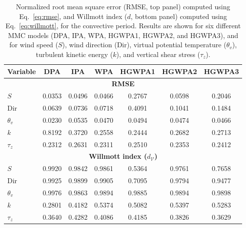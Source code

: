 \begin{table}[htb!]
\centering
\caption{Normalized root mean square error (RMSE, top panel) computed using Eq.~\ref{eq:rmse}, and Willmott index ($d$, bottom panel) computed using Eq.~\ref{eq:willmott}, for the convective period. Results are shown for six different MMC models (DPA, IPA, WPA, HGWPA1, HGWPA2, and HGWPA3), and for wind speed ($S$), wind direction (Dir), virtual potential temperature ($\theta_v$), turbulent kinetic energy ($k$), and vertical shear stress ($\tau_z$).}
\label{tab:convective}
\begin{tabular}{lcccccc}
\toprule
Variable & DPA & IPA & WPA & HGWPA1 & HGWPA2 & HGWPA3 \\
\midrule
\multicolumn{7}{c}{\textbf{RMSE}} \\
\midrule
$S$        & 0.0353 & 0.0496 & 0.0466 & 0.2767 & 0.0598 & 0.2046 \\
Dir        & 0.0639 & 0.0736 & 0.0718 & 0.4091 & 0.1041 & 0.1484 \\
$\theta_v$ & 0.0230 & 0.0535 & 0.0470 & 0.0494 & 0.0474 & 0.0466 \\
$k$        & 0.8192 & 0.3720 & 0.2558 & 0.2444 & 0.2682 & 0.2713 \\
$\tau_z$   & 0.2312 & 0.2631 & 0.2311 & 0.2510 & 0.2353 & 0.2412 \\
\midrule
\multicolumn{7}{c}{\textbf{Willmott index ($d_\mathcal{V}$)}} \\
\midrule
$S$        & 0.9920 & 0.9842 & 0.9861 & 0.5364 & 0.9761 & 0.7658 \\
Dir        & 0.9925 & 0.9899 & 0.9905 & 0.7095 & 0.9794 & 0.9477 \\
$\theta_v$ & 0.9976 & 0.9863 & 0.9894 & 0.9885 & 0.9894 & 0.9898 \\
$k$        & 0.2801 & 0.4182 & 0.5374 & 0.5082 & 0.5397 & 0.5283 \\
$\tau_z$   & 0.3640 & 0.4282 & 0.4086 & 0.4185 & 0.3826 & 0.3629 \\
\bottomrule
\end{tabular}
\end{table}



